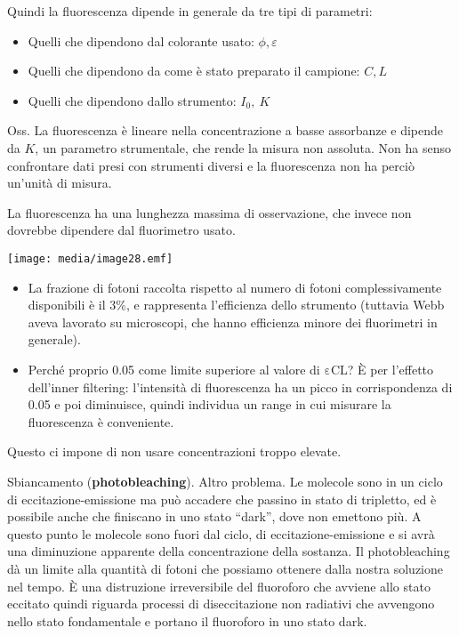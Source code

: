 Quindi la fluorescenza dipende in generale da tre tipi di parametri:

\begin{itemize}
\item
  Quelli che dipendono dal colorante usato: \(\phi,\varepsilon\)
\item
  Quelli che dipendono da come è stato preparato il campione: \(C,L\)
\item
  Quelli che dipendono dallo strumento: \(I_{0},\ K\)
\end{itemize}

Oss. La fluorescenza è lineare nella concentrazione a basse assorbanze e
dipende da \(K\), un parametro strumentale, che rende la misura non
assoluta. Non ha senso confrontare dati presi con strumenti diversi e la
fluorescenza non ha perciò un'unità di misura.

La fluorescenza ha una lunghezza massima di osservazione, che invece non
dovrebbe dipendere dal fluorimetro usato.

\texttt{[image: media/image28.emf]}

\begin{itemize}
\item
  La frazione di fotoni raccolta rispetto al numero di fotoni
  complessivamente disponibili è il 3\%, e rappresenta l'efficienza
  dello strumento (tuttavia Webb aveva lavorato su microscopi, che hanno
  efficienza minore dei fluorimetri in generale).
\item
  Perché proprio 0.05 come limite superiore al valore di \(\text{εCL}\)?
  È per l'effetto dell'inner filtering: l'intensità di fluorescenza ha
  un picco in corrispondenza di 0.05 e poi diminuisce, quindi individua
  un range in cui misurare la fluorescenza è conveniente.
\end{itemize}

Questo ci impone di non usare concentrazioni troppo elevate.

Sbiancamento (\textbf{photobleaching}). Altro problema. Le molecole sono
in un ciclo di eccitazione-emissione ma può accadere che passino in
stato di tripletto, ed è possibile anche che finiscano in uno stato
``dark'', dove non emettono più. A questo punto le molecole sono fuori
dal ciclo, di eccitazione-emissione e si avrà una diminuzione apparente
della concentrazione della sostanza. Il photobleaching dà un limite alla
quantità di fotoni che possiamo ottenere dalla nostra soluzione nel
tempo. È una distruzione irreversibile del fluoroforo che avviene allo
stato eccitato quindi riguarda processi di diseccitazione non radiativi
che avvengono nello stato fondamentale e portano il fluoroforo in uno
stato dark.

